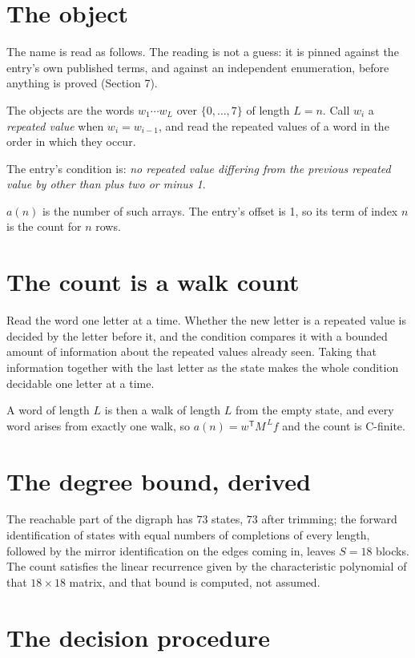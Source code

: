 \documentclass[11pt]{article}
\theoremstyle{definition}
\begin{document}
\section{The object}

The name is read as follows. The reading is not a guess: it is pinned against the entry's own published terms, and against an independent enumeration, before anything is proved (Section 7).

The objects are the words $w_1\cdots w_L$ over $\{0,\dots,7\}$ of length $L = n$. Call $w_i$ a {\itshape repeated value} when $w_i = w_{i-1}$, and read the repeated values of a word in the order in which they occur.

The entry's condition is: {\itshape no repeated value differing from the previous repeated value by other than plus two or minus 1}.

$a(n)$ is the number of such arrays. The entry's offset is 1, so its term of index $n$ is the count for $n$ rows.

\section{The count is a walk count}

Read the word one letter at a time. Whether the new letter is a repeated value is decided by the letter before it, and the condition compares it with a bounded amount of information about the repeated values already seen. Taking that information together with the last letter as the state makes the whole condition decidable one letter at a time.

A word of length $L$ is then a walk of length $L$ from the empty state, and every word arises from exactly one walk, so $a(n) = w^{\mathsf T}M^{\,L}f$ and the count is C-finite.

\section{The degree bound, derived}

The reachable part of the digraph has $73$ states, $73$ after trimming; the forward identification of states with equal numbers of completions of every length, followed by the mirror identification on the edges coming in, leaves $S = 18$ blocks. The count satisfies the linear recurrence given by the characteristic polynomial of that $18\times18$ matrix, and that bound is computed, not assumed.

\section{The decision procedure}
\end{document}
